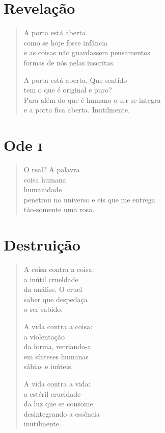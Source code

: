 \chapter{Revelação}

\begin{verse}
A porta está aberta\\
como se hoje fosse infância\\
e as coisas não guardassem pensamentos\\ formas de nós nelas inscritas.

A porta está aberta. Que sentido\\
tem o que é original e puro?\\
Para além do que é humano o ser se integra\\
e a porta fica aberta. Inutilmente.
\end{verse}

\chapter{Ode \textsc{i}}

\begin{verse}
O real? A palavra\\
coisa humana\\
humanidade\\
penetrou no universo e eis que me entrega\\ tão-somente uma rosa.
\end{verse}

\chapter{Destruição}

\begin{verse}
A coisa contra a coisa:\\
a inútil crueldade\\
da análise. O cruel\\
saber que despedaça\\
o ser sabido.

A vida contra a coisa:\\
a violentação\\
da forma, recriando-a\\
em sínteses humanas\\
sábias e inúteis.

A vida contra a vida:\\
a estéril crueldade\\
da luz que se consome\\
desintegrando a essência\\
inutilmente.
\end{verse}

